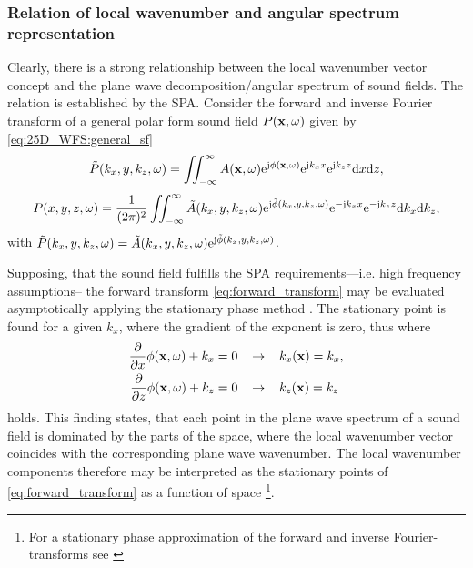 \subsubsection{Relation of local wavenumber and angular spectrum representation}
Clearly, there is a strong relationship between the local wavenumber vector concept and the plane wave decomposition/angular spectrum of sound fields. The relation is established by the SPA. Consider the forward and inverse Fourier transform of a general polar form sound field $P(\mathbf{x},\omega)$ given by \eqref{eq:25D_WFS:general_sf}
\begin{equation}
\tilde{P}(k_x,y,k_z,\omega) = \iint_{-\infty}^{\infty} A(\mathbf{x},\omega)\mathrm{e}^{\mathrm{j} \phi(\mathbf{x},\omega)} \mathrm{e}^{\mathrm{j} k_x x} \mathrm{e}^{\mathrm{j} k_z z} \mathrm{d} x \mathrm{d} z,
\label{eq:forward_transform}
\end{equation}
\begin{equation}
P(x,y,z,\omega) = \frac{1}{(2\pi)^2} \iint_{-\infty}^{\infty} \tilde{A}(k_x,y,k_z,\omega)\mathrm{e}^{\mathrm{j} \tilde{\phi}(k_x,y,k_z,\omega)}  \mathrm{e}^{-\mathrm{j} k_x x} \mathrm{e}^{-\mathrm{j} k_z z} \mathrm{d} k_x \mathrm{d} k_z,
\label{eq:inverse_transform}
\end{equation}
with $\tilde{P}(k_x,y,k_z,\omega) =\tilde{A}(k_x,y,k_z,\omega)\mathrm{e}^{\mathrm{j} \tilde{\phi}(k_x,y,k_z,\omega)}$.

Supposing, that the sound field fulfills the SPA requirements---i.e. high frequency assumptions-- the forward transform \eqref{eq:forward_transform}
may be evaluated asymptotically applying the stationary phase method \cite{Arnold1995, Tinkelman2005}. The stationary point is found for a given $k_x$, where the gradient of the exponent is zero, thus where
\begin{align}
\frac{\partial}{\partial x} \phi(\mathbf{x},\omega) + k_x &= 0 \hspace{3mm} \rightarrow \hspace{3mm} k_x(\mathbf{x}) = k_x, \\
\frac{\partial}{\partial z} \phi(\mathbf{x},\omega) + k_z &= 0 \hspace{3mm} \rightarrow \hspace{3mm} k_z(\mathbf{x}) = k_z
\end{align}
holds.
This finding states, that each point in the plane wave spectrum of a sound field is dominated by the parts of the space, where the local wavenumber vector coincides with the corresponding plane wave wavenumber. The local wavenumber components therefore may be interpreted as the stationary points of \eqref{eq:forward_transform} as a function of space \footnote{For a stationary phase approximation of the forward and inverse Fourier-transforms see \cite[Eq. 5.20, 5.51]{Tracy2014}}.

